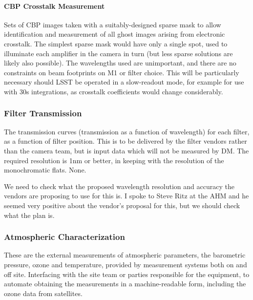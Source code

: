\paragraph {CBP Crosstalk Measurement}\label{sec:CPP:inputs:CBP:crosstalk}
Sets of CBP images taken with a suitably-designed sparse mask to allow identification and measurement of all ghost images arising from electronic crosstalk. The simplest sparse mask would have only a single spot, used to illuminate each amplifier in the camera in turn (but less sparse solutions are likely also possible). The wavelengths used are unimportant, and there are no constraints on beam footprints on M1 or filter choice. This will be particularly necessary should LSST be operated in a slow-readout mode, for example for use with 30s integrations, as crosstalk coefficients would change considerably.


\subsubsection{Filter Transmission}\label{sec:CPP:inputs:filterTransmission}
The transmission curves (transmission as a function of wavelength) for each filter, as a function of filter position. This is to be delivered by the filter vendors rather than the camera team, but is input data which will not be measured by DM. The required resolution is 1nm or better, in keeping with the resolution of the monochromatic flats.
\alg None.
\begin{note}
	We need to check what the proposed wavelength resolution and accuracy the vendors are proposing to use for this is. I spoke to Steve Ritz at the AHM and he seemed very positive about the vendor's proposal for this, but we should check what the plan is.
\end{note}


\subsubsection{Atmospheric Characterization}\label{sec:CPP:inputs:atmosphericData}
These are the external measurements of atmospheric parameters, \eg the barometric pressure, ozone and temperature, provided by measurement systems both on and off site.
\alg Interfacing with the site team or parties responsible for the equipment, to automate obtaining the measurements in a machine-readable form, including the ozone data from satellites.




